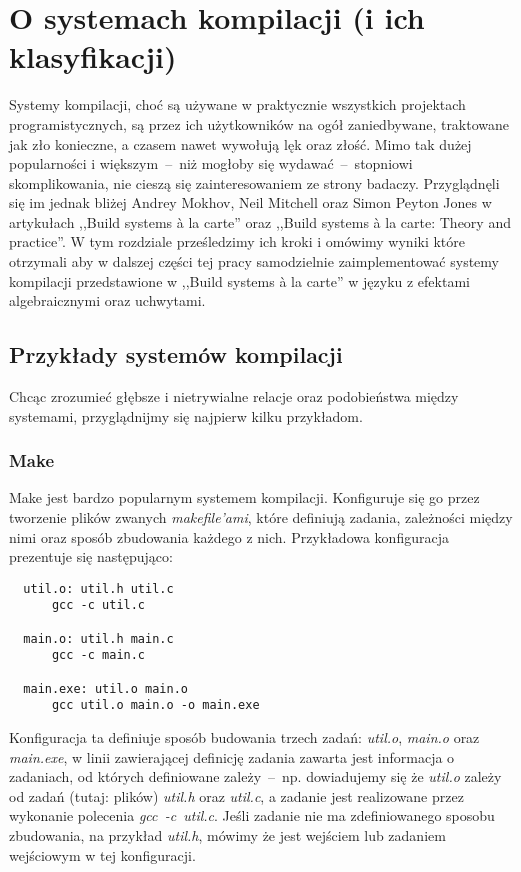 
\chapter{O systemach kompilacji (i ich klasyfikacji)}

Systemy kompilacji, choć są używane w praktycznie wszystkich projektach programistycznych, są przez ich użytkowników na ogół zaniedbywane, traktowane jak zło konieczne, a czasem nawet wywołują lęk oraz złość. Mimo tak dużej popularności i większym~--~niż mogłoby się wydawać~--~stopniowi skomplikowania, nie cieszą się zainteresowaniem ze strony badaczy. Przyglądnęli się im jednak bliżej Andrey Mokhov, Neil Mitchell oraz Simon Peyton Jones w artykułach ,,Build systems {\`a} la carte''\cite{mokhov2018build} oraz ,,Build systems {\`a} la carte: Theory and practice''\cite{mokhov2020build}. W tym rozdziale prześledzimy ich kroki i omówimy wyniki które otrzymali aby w dalszej części tej pracy samodzielnie zaimplementować systemy kompilacji przedstawione w ,,Build systems {\`a} la carte'' w języku z efektami algebraicznymi oraz uchwytami.

\section{Przykłady systemów kompilacji}

Chcąc zrozumieć głębsze i nietrywialne relacje oraz podobieństwa między systemami, przyglądnijmy się najpierw kilku przykładom.

\subsection{Make}

Make jest bardzo popularnym systemem kompilacji. Konfiguruje się go przez tworzenie plików zwanych \textit{makefile'ami}, które definiują zadania, zależności między nimi oraz sposób zbudowania każdego z nich. Przykładowa konfiguracja prezentuje się następująco:

\lstset{language=make}

\begin{lstlisting}
  util.o: util.h util.c
      gcc -c util.c

  main.o: util.h main.c
      gcc -c main.c

  main.exe: util.o main.o
      gcc util.o main.o -o main.exe
\end{lstlisting}

Konfiguracja ta definiuje sposób budowania trzech zadań: \textit{util.o}, \textit{main.o} oraz \textit{main.exe}, w linii zawierającej definicję zadania zawarta jest informacja o zadaniach, od których definiowane zależy~--~np. dowiadujemy się że \textit{util.o} zależy od zadań (tutaj: plików) \textit{util.h} oraz \textit{util.c}, a zadanie jest realizowane przez wykonanie polecenia \textit{gcc~\nobreakdash-c~util.c}. Jeśli zadanie nie ma zdefiniowanego sposobu zbudowania, na przykład \textit{util.h}, mówimy że jest wejściem lub zadaniem wejściowym w tej konfiguracji.

